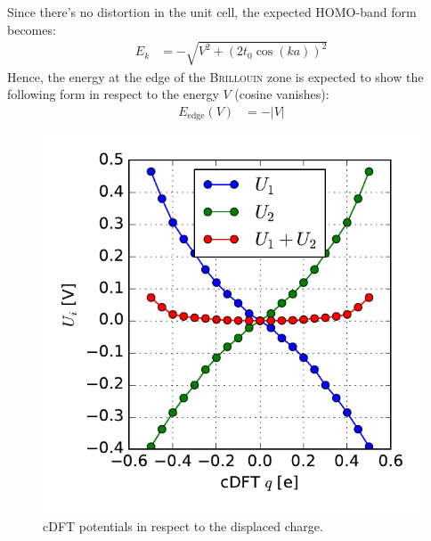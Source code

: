 Since there's no distortion in the unit cell, the expected HOMO-band form becomes:
\begin{align}
E_k &= -\sqrt{V^2 + \left(2t_0\cos(ka)\right)^2}
\end{align}
Hence, the energy at the edge of the \textsc{Brillouin} zone is expected to show the following form in respect to the energy $V$ (cosine vanishes):
\begin{align}
E_\text{edge}(V) &= -\left|V\right|
\end{align}
\begin{figure}
	\centering
	\begin{minipage}{0.49\textwidth}
			\centering
				\includegraphics[width = \textwidth]{Images/Hydrogen/charging/potential_q_1}
				\caption{cDFT potentials in respect to the displaced charge.\\}
				\label{image_potentials_qs_1}	
	\end{minipage}\hspace*{.5cm}
	\begin{minipage}{0.49\textwidth}
	\centering

\end{minipage}
\end{figure}
